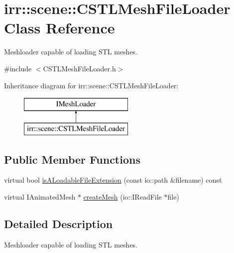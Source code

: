 \hypertarget{classirr_1_1scene_1_1_c_s_t_l_mesh_file_loader}{\section{irr\-:\-:scene\-:\-:C\-S\-T\-L\-Mesh\-File\-Loader Class Reference}
\label{classirr_1_1scene_1_1_c_s_t_l_mesh_file_loader}
}


Meshloader capable of loading S\-T\-L meshes.  




{\ttfamily \#include $<$C\-S\-T\-L\-Mesh\-File\-Loader.\-h$>$}

Inheritance diagram for irr\-:\-:scene\-:\-:C\-S\-T\-L\-Mesh\-File\-Loader\-:\begin{figure}[H]
\begin{center}
\leavevmode
\includegraphics[height=2.000000cm]{classirr_1_1scene_1_1_c_s_t_l_mesh_file_loader}
\end{center}
\end{figure}
\subsection*{Public Member Functions}
\begin{DoxyCompactItemize}
\item 
virtual bool \hyperlink{classirr_1_1scene_1_1_c_s_t_l_mesh_file_loader_a36621e1c62f96a510e2edd2354587ddd}{is\-A\-Loadable\-File\-Extension} (const io\-::path \&filename) const 
\item 
virtual I\-Animated\-Mesh $\ast$ \hyperlink{classirr_1_1scene_1_1_c_s_t_l_mesh_file_loader_a2d85c05914ca301c324c85a8a24c5586}{create\-Mesh} (io\-::\-I\-Read\-File $\ast$file)
\end{DoxyCompactItemize}


\subsection{Detailed Description}
Meshloader capable of loading S\-T\-L meshes. 

